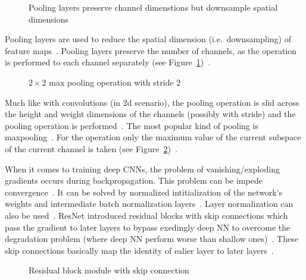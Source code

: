 \begin{figure}[h]
    \centering
    \caption[Channel dimension preserving of pooling layers]{%
        Pooling layers preserve channel dimenstions but downsample spatial
        dimensions\label{fig:pool-layer}
    }
\end{figure}
Pooling layers are used to reduce the spatial dimension (i.e.\ downsampling) of feature
maps~\citep{ponti_everything_2017}.
Pooling layers preserve the number of channels, as the operation is performed to each channel
separately (see Figure~\ref{fig:pool-layer})~\citep{chauhan_review_2018}.
\begin{figure}[ht]
    \centering
    \caption[Visualization of a max pooling operation]{%
        $2\times 2$ max pooling operation with stride
        2~\citep{chauhan_review_2018}\label{fig:maxpool}
    }
\end{figure}
Much like with convolutions (in 2d scenario), the pooling operation is slid across the height and
weight dimensions of the channels (possibly with stride) and the pooling operation is
performed~\citep{ponti_everything_2017,chauhan_review_2018}.
The most popular kind of pooling is maxpooling~\citep{ponti_everything_2017}.
For the operation only the maximum value of the current subspace of the current channel is
taken (see Figure~\ref{fig:maxpool})~\citep{chauhan_review_2018}.

When it comes to training deep \acp{CNN}, the problem of vanishing/exploding gradients occurs during
backpropagation.
This problem can be impede convergence~\citep{he_deep_2015}.
It can be solved by normalized intitialization of the network's weights and intermediate
batch normalization layers~\citep{he_deep_2015,bjorck_understanding_2018}.
Layer normalization can also be used~\citep{liu_rethinking_2021,ba_layer_2016}.
ResNet introduced residual blocks with skip connections which pass the gradient to later layers
to bypass exedingly deep \ac{NN} to overcome the degradation problem (where deep \ac{NN} perform
worse than shallow ones)~\citep{he_deep_2015}.
These skip connections basically map the identity of ealier layer to later
layers~\citep{he_deep_2015}.
\begin{figure}[ht]
    \centering
    \caption[Skip connection introduced by residual blocks]{%
        Residual block module with skip
        connection~\citep{he_deep_2015}\label{fig:skip-conn}
    }
\end{figure}

